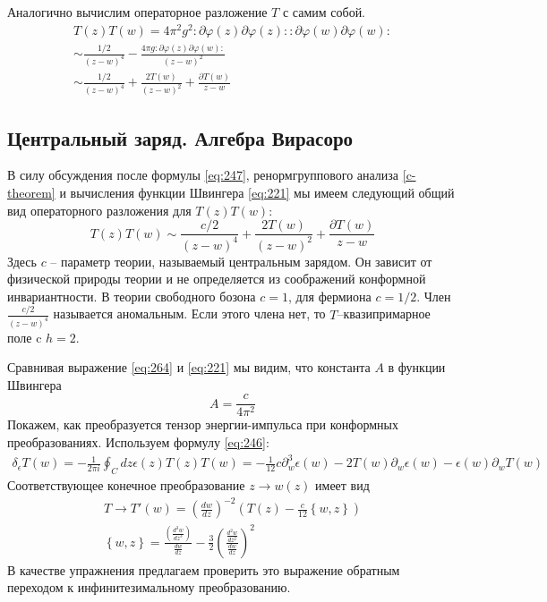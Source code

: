 \documentclass[a4paper,12pt]{article}
\theoremstyle{definition}
\theoremstyle{definition}
\theoremstyle{definition}
\begin{document}
Аналогично вычислим операторное разложение $T$  с самим собой.
\begin{multline}
  \label{eq:263}
  T(z) T(w) =4 \pi^{2}g^{2}:\partial \varphi(z) \partial \varphi(z): :\partial \varphi(w)\partial \varphi(w): \\
  \sim \frac{1/2}{(z-w)^{4}} -\frac{4\pi g:\partial \varphi(z) \partial \varphi(w):}{(z-w)^{2}} \\
  \sim \frac{1/2}{(z-w)^{4}}+ \frac{2T(w)}{(z-w)^{2}} +\frac{\partial T(w)}{z-w}
\end{multline}

\subsection{Центральный заряд. Алгебра Вирасоро}
\label{sec:virasoro}

В силу обсуждения после формулы \eqref{eq:247}, ренормгруппового анализа \ref{c-theorem} и вычисления функции Швингера  \eqref{eq:221} мы имеем следующий общий вид операторного разложения для $T(z)T(w)$:
\begin{equation}
  \label{eq:264}
  T(z)T(w) \sim \frac{c/2}{(z-w)^{4}}+ \frac{2T(w)}{(z-w)^{2}} +\frac{\partial T(w)}{z-w}
\end{equation}
Здесь $c$ -- параметр теории, называемый центральным зарядом. Он зависит от физической природы теории и не определяется из соображений конформной инвариантности. В теории свободного бозона $c=1$, для фермиона $c=1/2$. Член $\frac{c/2}{(z-w)^{4}}$ называется аномальным. Если этого члена нет, то $T$--квазипримарное поле c $h=2$. 

Сравнивая выражение \eqref{eq:264} и \eqref{eq:221} мы видим, что константа $A$ в функции Швингера
\begin{equation}
  \label{eq:265}
  A=\frac{c}{4\pi^{2}}
\end{equation}
Покажем, как преобразуется тензор энергии-импульса при конформных преобразованиях. Используем формулу \eqref{eq:246}:
\begin{multline}
  \label{eq:266}
  \delta_{\epsilon} T(w) =-\frac{1}{2\pi i} \oint_{C} dz \epsilon(z) T(z) T(w) =-\frac{1}{12} c \partial_{w}^{3}\epsilon(w) -2 T(w) \partial_{w} \epsilon(w) -\epsilon(w) \partial_{w}T(w) 
\end{multline}
Соответствующее конечное преобразование $z\to w(z)$ имеет вид
\begin{eqnarray}
  \label{eq:267}
  T\to T'(w) =\left(\frac{dw}{dz}\right)^{-2} \left(T(z) -\frac{c}{12} \left\{ w,z\right\}\right)\\
  \left\{ w,z\right\}=\frac{\left(\frac{d^{3}w}{dz^{3}}\right) } {\frac{dw}{dz}} -\frac{3}{2}\left(\frac{\frac{d^{2}w}{dz^{2}}}{\frac{dw}{dz}}\right)^{2}
\end{eqnarray}
В качестве упражнения предлагаем проверить это выражение обратным переходом к инфинитезимальному преобразованию.
\end{document}
